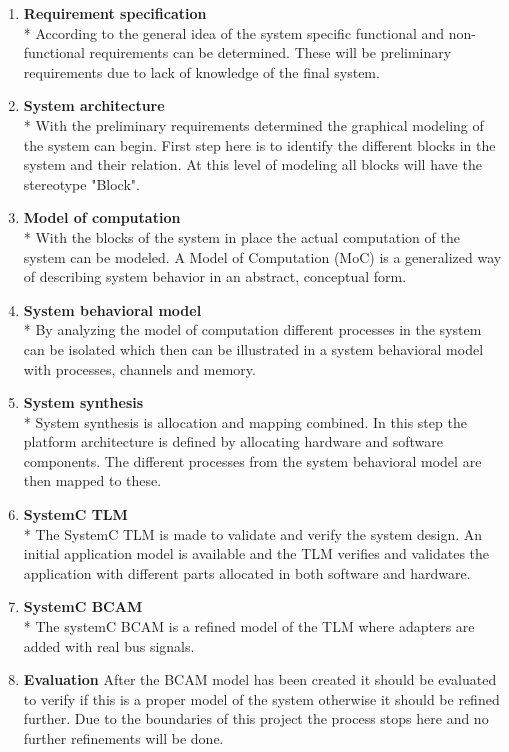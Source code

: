\begin{enumerate}
		
  \item \textbf{Requirement specification}\\*
  		According to the general idea of the system specific functional and non-functional requirements can be determined. These will be preliminary requirements due to lack of knowledge of the final system. 
  \item \textbf{System architecture}\\*
  		With the preliminary requirements determined the graphical modeling of the system can begin. First step here is to identify the different blocks in the system and their relation. At this level of modeling all blocks will have the stereotype "Block".
  \item \textbf{Model of computation}\\*
  		With the blocks of the system in place the actual computation of the system can be modeled. A Model of Computation (MoC) is a generalized way of describing system behavior in an abstract, conceptual form. 
  \item \textbf{System behavioral model}\\*
  		By analyzing the model of computation different processes in the system can be isolated which then can be illustrated in a system behavioral model with processes, channels and memory.
  \item \textbf{System synthesis}\\*
  		System synthesis is allocation and mapping combined. In this step the platform architecture is defined by allocating hardware and software components. The different processes from the system behavioral model are then mapped to these. 
  \item \textbf{SystemC TLM}\\*
  		The SystemC TLM is made to validate and verify the system design. An initial application model is available and the TLM verifies and validates the application with different parts allocated in both software and hardware.
  \item \textbf{SystemC BCAM}\\*
  		The systemC BCAM is a refined model of the TLM where adapters are added with real bus signals. 
  \item \textbf{Evaluation}
  		After the BCAM model has been created it should be evaluated to verify if this is a proper model of the system otherwise it should be refined further. Due to the boundaries of this project the process stops here and no further refinements will be done.
\end{enumerate}
